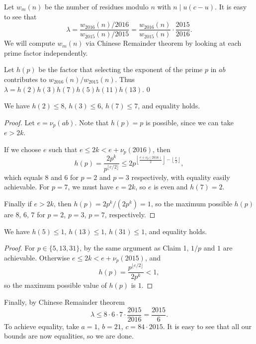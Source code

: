 Let $w_m(n)$ be the number of residues modulo $n$ with $n\mid u(c-u)$. It is easy to see that \[\lambda=\frac{w_{2016}(n)/2016}{w_{2015}(n)/2015}=\frac{w_{2016}(n)}{w_{2015}(n)}\cdot\frac{2015}{2016}.\]
We will compute $w_m(n)$ via Chinese Remainder theorem by looking at each prime factor independently.

Let $h(p)$ be the factor that selecting the exponent of the prime $p$ in $ab$ contributes to $w_{2016}(n)/w_{2015}(n)$. Thus $\lambda=h(2)h(3)h(7)h(5)h(11)h(13)$.
\setcounter{claim}0
\begin{claim}
    We have $h(2)\le8$, $h(3)\le6$, $h(7)\le7$, and equality holds.
\end{claim}
\begin{proof}
    Let $e=\nu_p(ab)$. Note that $h(p)=p$ is possible, since we can take $e>2k$.

    If we choose $e$ such that $e\le 2k<e+\nu_p(2016)$, then \[h(p)=\frac{2p^k}{p^{\lfloor e/2\rfloor}}\le2p^{\left\lfloor\tfrac{e+\nu_p(2016)}2\right\rfloor-\left\lfloor\tfrac e2\right\rfloor},\]
    which equals $8$ and $6$ for $p=2$ and $p=3$ respectively, with equality easily achievable. For $p=7$, we must have $e=2k$, so $e$ is even and $h(7)=2$.

    Finally if $e>2k$, then $h(p)=2p^k/(2p^k)=1$, so the maximum possible $h(p)$ are $8$, $6$, $7$ for $p=2$, $p=3$, $p=7$, respectively.
\end{proof}
\begin{claim}
    We have $h(5)\le1$, $h(13)\le1$, $h(31)\le1$, and equality holds.
\end{claim}
\begin{proof}
    For $p\in\{5,13,31\}$, by the same argument as Claim 1, $1/p$ and $1$ are achievable. Otherwise $e\le2k<e+\nu_p(2015)$, and \[h(p)=\frac{p^{\lfloor e/2\rfloor}}{2p^k}<1,\]
    so the maximum possible value of $h(p)$ is $1$.
\end{proof}

Finally, by Chinese Remainder theorem \[\lambda\le8\cdot6\cdot7\cdot\frac{2015}{2016}=\frac{2015}6.\]
To achieve equality, take $a=1$, $b=21$, $c=84\cdot2015$. It is easy to see that all our bounds are now equalities, so we are done.

